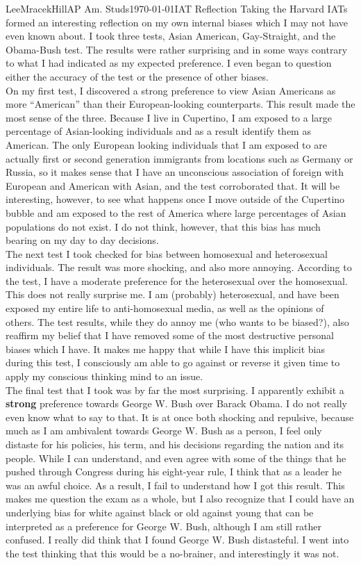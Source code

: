 \documentclass[a4paper, 11pt]{article}
\begin{document}
\begin{mla}{Lee}{Mracek}{Hill}{AP Am. Studs}{\today}{IAT Reflection}
    Taking the Harvard IATs formed an interesting reflection on my own internal biases which I may not have even known about. I took three tests, Asian American, Gay-Straight, and the Obama-Bush test. The results were rather surprising and in some ways contrary to what I had indicated as my expected preference. I even began to question either the accuracy of the test or the presence of other biases. \\
    On my first test, I discovered a strong preference to view Asian Americans as more ``American'' than their European-looking counterparts. This result made the most sense of the three. Because I live in Cupertino, I am exposed to a large percentage of Asian-looking individuals and as a result identify them as American. The only European looking individuals that I am exposed to are actually first or second generation immigrants from locations such as Germany or Russia, so it makes sense that I have an unconscious association of foreign with European and American with Asian, and the test corroborated that. It will be interesting, however, to see what happens once I move outside of the Cupertino bubble and am exposed to the rest of America where large percentages of Asian populations do not exist. I do not think, however, that this bias has much bearing on my day to day decisions. \\
    The next test I took checked for bias between homosexual and heterosexual individuals. The result was more shocking, and also more annoying. According to the test, I have a moderate preference for the heterosexual over the homosexual. This does not really surprise me. I am (probably) heterosexual, and have been exposed my entire life to anti-homosexual media, as well as the opinions of others. The test results, while they do annoy me (who wants to be biased?), also reaffirm my belief that I have removed some of the most destructive personal biases which I have. It makes me happy that while I have this implicit bias during this test, I consciously am able to go against or reverse it given time to apply my conscious thinking mind to an issue. \\
    The final test that I took was by far the most surprising. I apparently exhibit a \textbf{strong} preference towards George W. Bush over Barack Obama. I do not really even know what to say to that. It is at once both shocking and repulsive, because much as I am ambivalent towards George W. Bush as a person, I feel only distaste for his policies, his term, and his decisions regarding the nation and its people. While I can understand, and even agree with some of the things that he pushed through Congress during his eight-year rule, I think that as a leader he was an awful choice. As a result, I fail to understand how I got this result. This makes me question the exam as a whole, but I also recognize that I could have an underlying bias for white against black or old against young that can be interpreted as a preference for George W. Bush, although I am still rather confused. I really did think that I found George W. Bush distasteful. I went into the test thinking that this would be a no-brainer, and interestingly it was not.\\

\end{mla}
\end{document}
